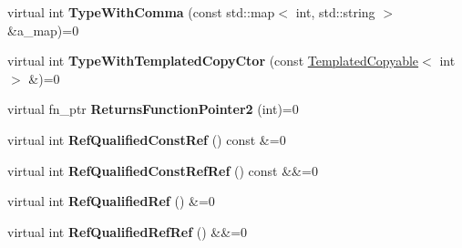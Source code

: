 \begin{DoxyCompactItemize}
\item 
\mbox{\label{classtesting_1_1gmock__function__mocker__test_1_1FooInterface_af1f1d96db798fadbf53fbd886e7c738e}} 
virtual int {\bfseries Type\+With\+Comma} (const std\+::map$<$ int, std\+::string $>$ \&a\+\_\+map)=0
\item 
\mbox{\label{classtesting_1_1gmock__function__mocker__test_1_1FooInterface_af9e3190c69647229baed1dba41c2fdf8}} 
virtual int {\bfseries Type\+With\+Templated\+Copy\+Ctor} (const \mbox{\hyperlink{classtesting_1_1gmock__function__mocker__test_1_1TemplatedCopyable}{Templated\+Copyable}}$<$ int $>$ \&)=0
\item 
\mbox{\label{classtesting_1_1gmock__function__mocker__test_1_1FooInterface_ae1315a533d4f38afb178623ac7c2337d}} 
virtual fn\+\_\+ptr {\bfseries Returns\+Function\+Pointer2} (int)=0
\item 
\mbox{\label{classtesting_1_1gmock__function__mocker__test_1_1FooInterface_a97d8d9433b4c154e96f6523589ebf4da}} 
virtual int {\bfseries Ref\+Qualified\+Const\+Ref} () const \&=0
\item 
\mbox{\label{classtesting_1_1gmock__function__mocker__test_1_1FooInterface_aa51eb97c5a8fe915a6a5ef2a24c8b192}} 
virtual int {\bfseries Ref\+Qualified\+Const\+Ref\+Ref} () const \&\&=0
\item 
\mbox{\label{classtesting_1_1gmock__function__mocker__test_1_1FooInterface_ab593a18ba3b8f905b7d1af553d0d2ea1}} 
virtual int {\bfseries Ref\+Qualified\+Ref} () \&=0
\item 
\mbox{\label{classtesting_1_1gmock__function__mocker__test_1_1FooInterface_a4029023fc8c82f8810b46dc87f6887e6}} 
virtual int {\bfseries Ref\+Qualified\+Ref\+Ref} () \&\&=0
\item 
\mbox{\label{classtesting_1_1gmock__function__mocker__test_1_1FooInterface_aa38bdef20c08e3e0afff67b86bb0effb}} 

\end{DoxyCompactItemize}

